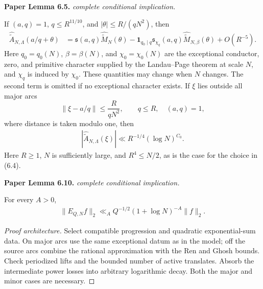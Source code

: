 \begin{lemma}
\label{prime_arc_approximation}
\leanok
\par\medskip\noindent\textbf{Paper Lemma 6.5.} \textit{complete conditional implication.}\par
If \((a,q)=1\), \(q\leq R^{11/10}\), and
\(|\theta|\leq R/(qN^2)\), then
\begin{align}
 \widehat{\widetilde A}_{N,\Lambda}(a/q+\theta)
 &=\mathfrak s(a,q)\widehat{\widetilde M}_N(\theta)
 -\mathbf1_{q_0\mid q}\mathfrak s_{\chi_q}(a,q)
   \widehat{\widetilde M}_{N,\beta}(\theta)
 +O(R^{-5}).
\end{align}
Here \(q_0=q_0(N)\), \(\beta=\beta(N)\), and
\(\chi_0=\chi_0(N)\) are the exceptional conductor, zero, and primitive
character supplied by the Landau--Page theorem at scale \(N\), and
\(\chi_q\) is induced by \(\chi_0\).  These quantities may change when
\(N\) changes. The second term is omitted if no exceptional character
exists. If $\xi$ lies outside all major arcs
\[
 \left\|\xi-a/q\right\|\leq\frac{R}{qN^2},
 \qquad q\leq R,\quad(a,q)=1,
\]
where distance is taken modulo one, then
\begin{align}
 |\widehat{\widetilde A}_{N,\Lambda}(\xi)|
 \ll R^{-1/4}(\log N)^{C_0}.
\end{align}
Here $R\geq1$, $N$ is sufficiently large, and $R^4\leq N/2$,
as is the case for the choice in \textup{(6.4)}.
\par\medskip\noindent\textbf{Paper Lemma 6.10.} \textit{complete conditional implication.}\par
For every \(A>0\),
\begin{align}
 \|E_{Q,N}f\|_2
 \ll_A Q^{-1/2}(1+\log N)^{-A}\|f\|_2.
\end{align}
\end{lemma}
\begin{proof}[Proof architecture]
\leanok
Select compatible progression and quadratic exponential-sum data. On major arcs use the same exceptional datum as in the model; off the source arcs combine the rational approximation with the Ren and Ghosh bounds. Check periodized lifts and the bounded number of active translates. Absorb the intermediate power losses into arbitrary logarithmic decay. Both the major and minor cases are necessary.
\end{proof}

